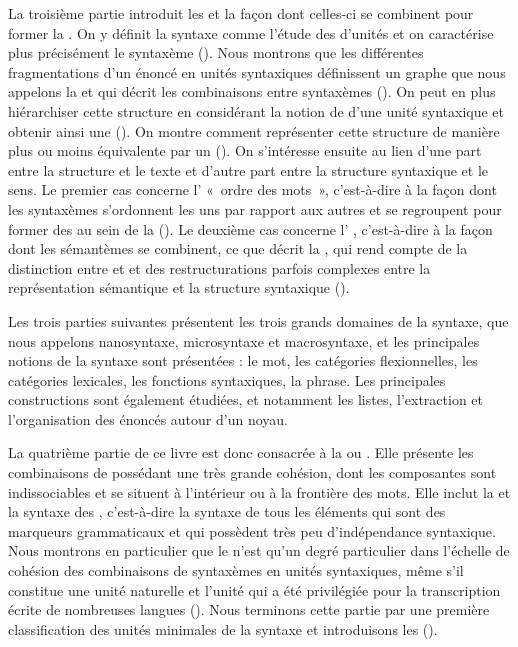La troisième partie introduit les  et la façon dont celles-ci se combinent pour former la . On y définit la syntaxe comme l’étude des  d’unités et on caractérise plus précisément le syntaxème (). Nous montrons que les différentes fragmentations d’un énoncé en unités syntaxiques définissent un graphe que nous appelons la  et qui décrit les combinaisons entre syntaxèmes (). On peut en plus hiérarchiser cette structure en considérant la notion de  d’une unité syntaxique et obtenir ainsi une  (). On montre comment représenter cette structure de manière plus ou moins équivalente par un  (). On s’intéresse ensuite au lien d’une part entre la structure et le texte et d’autre part entre la structure syntaxique et le sens. Le premier cas concerne l’ «~ordre des mots~», c’est-à-dire à la façon dont les syntaxèmes s’ordonnent les uns par rapport aux autres et se regroupent pour former des  au sein de la  (). Le deuxième cas concerne l’ , c’est-à-dire à la façon dont les sémantèmes se combinent, ce que décrit la , qui rend compte de la distinction entre  et  et des restructurations parfois complexes entre la représentation sémantique et la structure syntaxique ().

Les trois parties suivantes présentent les trois grands domaines de la syntaxe, que nous appelons nanosyntaxe, microsyntaxe et macrosyntaxe, et les principales notions de la syntaxe sont présentées : le mot, les catégories flexionnelles, les catégories lexicales, les fonctions syntaxiques, la phrase. Les principales constructions sont également étudiées, et notamment les listes, l’extraction et l’organisation des énoncés autour d’un noyau.

La quatrième partie de ce livre est donc consacrée à la  ou . Elle présente les combinaisons de  possédant une très grande cohésion, dont les composantes sont indissociables et se situent à l’intérieur ou à la frontière des mots. Elle inclut la  et la syntaxe des , c’est-à-dire la syntaxe de tous les éléments qui sont des marqueurs grammaticaux et qui possèdent très peu d’indépendance syntaxique. Nous montrons en particulier que le  n’est qu’un degré particulier dans l’échelle de cohésion des combinaisons de syntaxèmes en unités syntaxiques, même s’il constitue une unité naturelle et l’unité qui a été privilégiée pour la transcription écrite de nombreuses langues (). Nous terminons cette partie par une première classification des unités minimales de la syntaxe et introduisons les   ().

